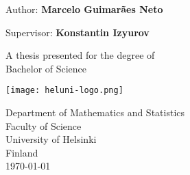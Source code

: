 \begin{titlepage}
    \begin{center}
            
        \Huge
        \textbf{\thtitle}
            
        \vspace{0.5cm}
        \LARGE
        \thsubtitle  
        
		\vspace{1cm}
        \Large    
        Author: \textbf{Marcelo Guimarães Neto}
		
		Supervisor: \textbf{Konstantin Izyurov}

        \vfill
        A thesis presented for the degree of\\
        Bachelor of Science
            
        \vspace{0.8cm}
        \texttt{[image: heluni-logo.png]}
        
        \vspace{0.8cm}
        Department of Mathematics and Statistics\\
        Faculty of Science\\
        University of Helsinki\\
        Finland\\
        \today
            
    \end{center}
\end{titlepage}
